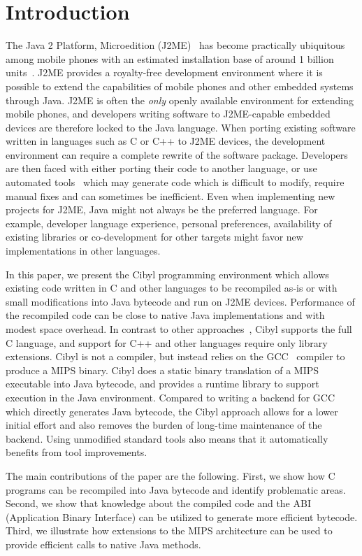\section{Introduction}
The Java 2 Platform, Microedition (J2ME)~\cite{j2me} has become practically
ubiquitous among mobile phones with an estimated installation base of around 1
billion units~\cite{schwartz06j2mecoverage}. J2ME provides a royalty-free
development environment where it is possible to extend the capabilities of
mobile phones and other embedded systems through Java.  J2ME is often the
\emph{only} openly available environment for extending mobile phones, and
developers writing software to J2ME-capable embedded devices are therefore
locked to the Java language. When porting existing software written in
languages such as C or C++ to J2ME devices, the development environment can
require a complete rewrite of the software package. Developers are then faced
with either porting their code to another language, or use automated
tools~\cite{martin02ephedra, buddrus98cappucino, malabarba99mohca, jazillan}
which may generate code which is difficult to modify, require manual fixes and
can sometimes be inefficient. Even when implementing new projects for J2ME,
Java might not always be the preferred language. For example, developer
language experience, personal preferences, availability of existing libraries
or co-development for other targets might favor new implementations in other
languages.

In this paper, we present the Cibyl programming environment which allows
existing code written in C and other languages to be recompiled as-is or with
small modifications into Java bytecode and run on J2ME devices. Performance of
the recompiled code can be close to native Java implementations and with
modest space overhead. In contrast to other approaches~\cite{axiomsol}, Cibyl
supports the full C language, and support for C++ and other languages
require only library extensions. Cibyl is not a compiler, but instead relies
on the GCC~\cite{gcc} compiler to produce a MIPS binary. Cibyl does a static
binary translation of a MIPS executable into Java bytecode, and provides a
runtime library to support execution in the Java environment. Compared to
writing a backend for GCC which directly generates Java bytecode, the Cibyl
approach allows for a lower initial effort and also removes the burden of
long-time maintenance of the backend. Using unmodified standard tools also
means that it automatically benefits from tool improvements.

The main contributions of the paper are the following. First, we show how C
programs can be recompiled into Java bytecode and identify problematic areas.
Second, we show that knowledge about the compiled code and the ABI
(Application Binary Interface) can be utilized to generate more efficient
bytecode.  Third, we illustrate how extensions to the MIPS architecture can be
used to provide efficient calls to native Java methods.

